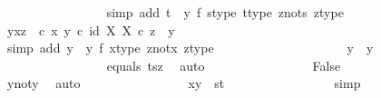 \begin{isabellebody}
\ \ \ \ \ \ \ \ \ \ \ \ \ \ \ \isamarkupfalse%
\ {\isacharparenleft}{\kern0pt}simp\ add{\isacharcolon}{\kern0pt}\ {\isacartoucheopen}t\ {\isasymnoteq}\ y{}{\isacartoucheclose}\ f{}\ s{\isacharunderscore}{\kern0pt}type\ t{\isacharunderscore}{\kern0pt}type\ z{\isacharunderscore}{\kern0pt}not{\isacharunderscore}{\kern0pt}s\ z{\isacharunderscore}{\kern0pt}type{\isacharparenright}{\kern0pt}\isanewline
\ \ \ \ \ \ \ \ \ \ \ \ \ \isamarkupfalse%
\ y{\isacharunderscore}{\kern0pt}xz{\isacharcolon}{\kern0pt}\ {\isachardoublequoteopen}{\isacharparenleft}{\kern0pt}{\isasymTheta}\ {\isasymcirc}\isactrlsub c\ {\isasymlangle}x{\isacharcomma}{\kern0pt}\ y{\isasymrangle}{\isacharparenright}{\kern0pt}\isactrlsup {\isasymflat}\ {\isasymcirc}\isactrlsub c\ {\isasymlangle}id\ X{\isacharcomma}{\kern0pt}\ {\isasymbeta}\isactrlbsub X\isactrlesub {\isasymrangle}\ {\isasymcirc}\isactrlsub c\ z\ {\isacharequal}{\kern0pt}\ y{}{\isachardoublequoteclose}\isanewline
\ \ \ \ \ \ \ \ \ \ \ \ \ \ \ \isamarkupfalse%
\ {\isacharparenleft}{\kern0pt}simp\ add{\isacharcolon}{\kern0pt}\ {\isacartoucheopen}y\ {\isacharequal}{\kern0pt}\ y{}{\isacartoucheclose}\ f{}\ x{\isacharunderscore}{\kern0pt}type\ z{\isacharunderscore}{\kern0pt}not{\isacharunderscore}{\kern0pt}x\ z{\isacharunderscore}{\kern0pt}type{\isacharparenright}{\kern0pt}\ \ \ \ \isanewline
\ \ \ \ \ \ \ \ \ \ \ \ \ \isamarkupfalse%
\ \isamarkupfalse%
\ {\isachardoublequoteopen}y{}\ {\isacharequal}{\kern0pt}\ y{}{\isachardoublequoteclose}\isanewline
\ \ \ \ \ \ \ \ \ \ \ \ \ \ \ \isamarkupfalse%
\ equals{}\ t{\isacharunderscore}{\kern0pt}sz\ \isamarkupfalse%
\ auto\isanewline
\ \ \ \ \ \ \ \ \ \ \ \ \ \isamarkupfalse%
\ \isamarkupfalse%
\ False\isanewline
\ \ \ \ \ \ \ \ \ \ \ \ \ \ \ \isamarkupfalse%
\ y{}{\isacharunderscore}{\kern0pt}not{\isacharunderscore}{\kern0pt}y{}\ \isamarkupfalse%
\ auto\isanewline
\ \ \ \ \ \ \ \ \ \ \ \ \ \isamarkupfalse%
\ \isamarkupfalse%
\ {\isachardoublequoteopen}{\isasymlangle}x{\isacharcomma}{\kern0pt}y{\isasymrangle}\ {\isacharequal}{\kern0pt}\ {\isasymlangle}s{\isacharcomma}{\kern0pt}t{\isasymrangle}{\isachardoublequoteclose}\isanewline
\ \ \ \ \ \ \ \ \ \ \ \ \ \ \ \isamarkupfalse%
\ simp\isanewline
\ \ \ \ \ \ \ \ \ \ \ \isamarkupfalse%
\isanewline

\end{isabellebody}
